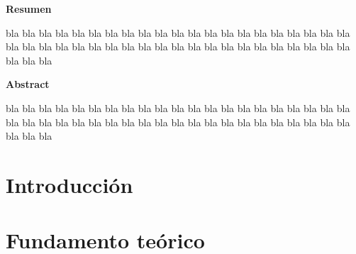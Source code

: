 \documentclass[11pt,a4paper,twoside,pdf]{article}
\numberwithin{equation}{section}
\begin{document}
\newpage
%
\begin{center}
{\bf Resumen}
\bigskip

\begin{minipage}{0.8\linewidth}
bla bla bla bla bla bla bla bla bla bla bla bla bla bla bla
bla bla bla bla bla bla bla bla bla bla bla bla bla bla bla
bla bla bla bla bla bla bla bla bla bla bla bla bla bla bla 
\end{minipage}

\vfill

{\bf Abstract} 
\bigskip

\begin{minipage}{0.8\linewidth}
bla bla bla bla bla bla bla bla bla bla bla bla bla bla bla
bla bla bla bla bla bla bla bla bla bla bla bla bla bla bla
bla bla bla bla bla bla bla bla bla bla bla bla bla bla bla 
\end{minipage}

\vfill

\end{center}


\tableofcontents


\newpage

\pagestyle{fancy}
\fancyhead[RO,LE]{\leftmark}
\fancyhead[LO,RE]{\thepage}
\fancyfoot{}

\normalsize

\section{Introducción}

\lipsum[1-1]


\section{Fundamento teórico}

\lipsum[1-1]


\end{document}
